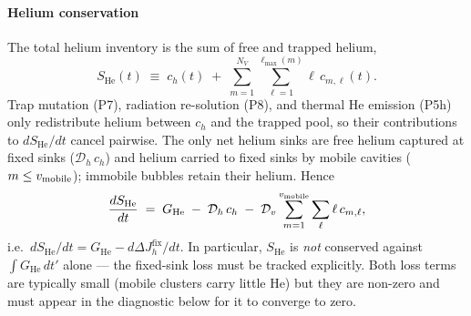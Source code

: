 \paragraph{Helium conservation}
The total helium inventory is the sum of free and trapped helium,
\begin{equation}
    S_{\mathrm{He}}(t)
    \;\equiv\; c_h(t)
    \;+\; \sum_{m=1}^{N_V}\sum_{\ell=1}^{\ell_{\max}(m)}
              \ell\,c_{m,\ell}(t).
\end{equation}
Trap mutation (P7), radiation re-solution (P8), and thermal He emission (P5h)
only redistribute helium between $c_h$ and the trapped pool, so their
contributions to $dS_{\mathrm{He}}/dt$ cancel pairwise. The only net helium
sinks are free helium captured at fixed sinks ($\mathcal{D}_h\,c_h$) and helium
carried to fixed sinks by mobile cavities ($m \le v_{\rm mobile}$); immobile
bubbles retain their helium. Hence
\begin{equation}\label{eq:mass_He}
    \frac{dS_{\mathrm{He}}}{dt}
    \;=\; G_{\mathrm{He}}
    \;-\; \mathcal{D}_h\,c_h
    \;-\; \mathcal{D}_v
          \sum_{m=1}^{v_{\rm mobile}}\sum_{\ell} \ell\,c_{m,\ell},
\end{equation}
i.e.\ $dS_{\mathrm{He}}/dt = G_{\mathrm{He}} - d\Delta J_h^{\mathrm{fix}}/dt$.
In particular, $S_{\mathrm{He}}$ is \emph{not} conserved against
$\int G_{\mathrm{He}}\,dt'$ alone --- the fixed-sink loss must be tracked
explicitly. Both loss terms are typically small (mobile clusters carry little
He) but they are non-zero and must appear in the diagnostic below for it to
converge to zero.


